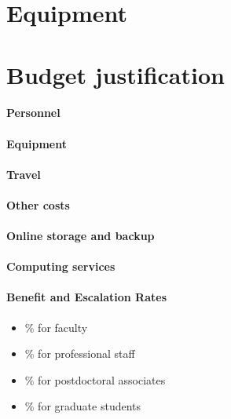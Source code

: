\documentclass[11pt]{article}
\begin{document}
\clearpage
\section*{Equipment}


\clearpage
\section*{Budget justification}

\paragraph{Personnel}

\paragraph{Equipment}

\paragraph{Travel}

\paragraph{Other costs}

\paragraph{Online storage and backup}

\paragraph{Computing services}
 
\paragraph{Benefit and Escalation Rates}
\begin{itemize}
\item \% for faculty
\item \% for professional staff
\item \% for postdoctoral associates
\item \% for graduate students
\end{itemize}
\end{document}
